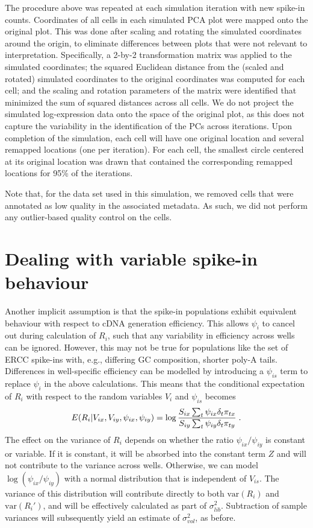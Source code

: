 \documentclass{article}
\begin{document}
The procedure above was repeated at each simulation iteration with new spike-in counts.
Coordinates of all cells in each simulated PCA plot were mapped onto the original plot.
This was done after scaling and rotating the simulated coordinates around the origin, to eliminate differences between plots that were not relevant to interpretation.
Specifically, a 2-by-2 transformation matrix was applied to the simulated coordinates;
    the squared Euclidean distance from the (scaled and rotated) simulated coordinates to the original coordinates was computed for each cell;
    and the scaling and rotation parameters of the matrix were identified that minimized the sum of squared distances across all cells.
We do not project the simulated log-expression data onto the space of the original plot, as this does not capture the variability in the identification of the PCs across iterations.
Upon completion of the simulation, each cell will have one original location and several remapped locations (one per iteration). 
For each cell, the smallest circle centered at its original location was drawn that contained the corresponding remapped locations for 95\% of the iterations.

Note that, for the data set used in this simulation, we removed cells that were annotated as low quality in the associated metadata.
As such, we did not perform any outlier-based quality control on the cells.

\newpage
\section{Dealing with variable spike-in behaviour}
Another implicit assumption is that the spike-in populations exhibit equivalent behaviour with respect to cDNA generation efficiency.
This allows $\psi_i$ to cancel out during calculation of $R_i$, such that any variability in efficiency across wells can be ignored.
However, this may not be true for populations like the set of ERCC spike-ins with, e.g., differing GC composition, shorter poly-A tails.
Differences in well-specific efficiency can be modelled by introducing a $\psi_{is}$ term to replace $\psi_i$ in the above calculations.
This means that the conditional expectation of $R_i$ with respect to the random variables $V_{i}$ and $\psi_{is}$ becomes
\[
E(R_i | V_{ix}, V_{iy},  \psi_{ix}, \psi_{iy} ) = \log \frac{ S_{ix} \sum_t \psi_{ix}\delta_{t} \pi_{tx} } { S_{iy}\sum_t \psi_{iy}\delta_{t} \pi_{ty} } \;. \\
\]
The effect on the variance of $R_i$ depends on whether the ratio $\psi_{ix}/\psi_{iy}$ is constant or variable.
If it is constant, it will be absorbed into the constant term $Z$ and will not contribute to the variance across wells.
Otherwise, we can model $\log(\psi_{ix}/\psi_{iy})$ with a normal distribution that is independent of $V_{is}$.
The variance of this distribution will contribute directly to both $\mbox{var}(R_i)$ and $\mbox{var}(R_i')$, and will be effectively calculated as part of $\sigma^2_{lib}$.
Subtraction of sample variances will subsequently yield an estimate of $\sigma^2_{vol}$, as before.
\end{document}
